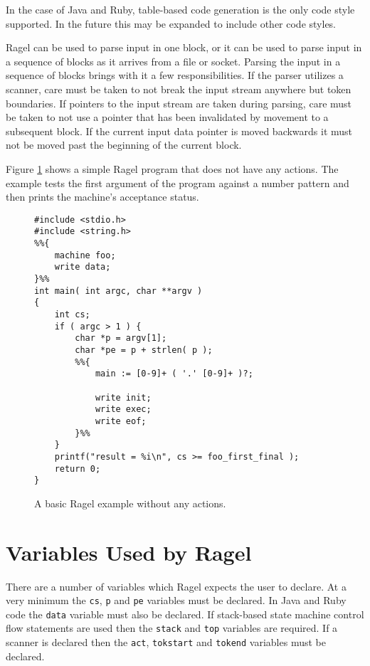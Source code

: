 \documentclass[letterpaper,11pt,oneside]{book}
\begin{document}
In the case of Java and Ruby, table-based code generation is the only code
style supported. In the future this may be expanded to include other code
styles.

Ragel can be used to parse input in one block, or it can be used to parse input
in a sequence of blocks as it arrives from a file or socket.  Parsing the input
in a sequence of blocks brings with it a few responsibilities. If the parser
utilizes a scanner, care must be taken to not break the input stream anywhere
but token boundaries.  If pointers to the input stream are taken during
parsing, care must be taken to not use a pointer that has been invalidated by
movement to a subsequent block.  If the current input data pointer is moved
backwards it must not be moved past the beginning of the current block.

Figure \ref{basic-example} shows a simple Ragel program that does not have any
actions. The example tests the first argument of the program against a number
pattern and then prints the machine's acceptance status.

\begin{figure}
\small
\begin{verbatim}
#include <stdio.h>
#include <string.h>
%%{
    machine foo;
    write data;
}%%
int main( int argc, char **argv )
{
    int cs;
    if ( argc > 1 ) {
        char *p = argv[1];
        char *pe = p + strlen( p );
        %%{ 
            main := [0-9]+ ( '.' [0-9]+ )?;

            write init;
            write exec;
            write eof;
        }%%
    }
    printf("result = %i\n", cs >= foo_first_final );
    return 0;
}
\end{verbatim}
\caption{A basic Ragel example without any actions.}
\label{basic-example}
\end{figure}

\section{Variables Used by Ragel}

There are a number of variables which Ragel expects the user to declare. At a
very minimum the \verb|cs|, \verb|p| and \verb|pe| variables must be declared.
In Java and Ruby code the \verb|data| variable must also be declared. If
stack-based state machine control flow statements are used then the
\verb|stack| and \verb|top| variables are required. If a scanner is declared
then the \verb|act|, \verb|tokstart| and \verb|tokend| variables must be
declared.
\end{document}
